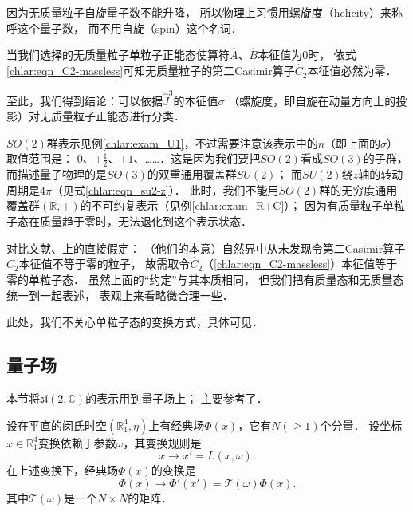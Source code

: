 因为无质量粒子自旋量子数不能升降，
所以物理上习惯用{\heiti 螺旋度}（helicity）来称呼这个量子数，
而不用自旋（spin）这个名词．


当我们选择的无质量粒子单粒子正能态使算符$\hat{A}$、$\hat{B}$本征值为$0$时，
依式\eqref{chlar:eqn_C2-massless}可知无质量粒子的第二Casimir算子$\hat{C}_2$本征值必然为零．



至此，我们得到结论：{\kaishu 可以依据$\hat{J}^3$的本征值$\sigma$
	（螺旋度，即自旋在动量方向上的投影）对无质量粒子正能态进行分类．}

$SO(2)$群表示见例\ref{chlar:exam_U1}，不过需要注意该表示中的$n$（即上面的$\sigma$）取值范围是：
$0$、$\pm\frac{1}{2}$、$\pm 1$、……．这是因为我们要把$SO(2)$看成$SO(3)$的子群，
而描述量子物理的是$SO(3)$的双重通用覆盖群$SU(2)$；
而$SU(2)$绕$z$轴的转动周期是$4\pi$（见式\eqref{chlar:eqn_su2-z}）．
此时，我们不能用$SO(2)$群的无穷度通用覆盖群$(\mathbb{R},+)$的不可约复表示（见例\ref{chlar:exam_R+C}）；
因为有质量粒子单粒子态在质量趋于零时，无法退化到这个表示状态．


对比文献\parencite[p.72]{weinberg_vol1}、\parencite[p.198]{tung-1985}上的直接假定：
（他们的本意）自然界中从未发现令第二Casimir算子$\hat{C}_2$本征值不等于零的粒子，
故需取令$\hat{C}_2$（\eqref{chlar:eqn_C2-massless}）本征值等于零的单粒子态．
虽然上面的“约定”与其本质相同，
但我们\cite{liu_ge-2014}把有质量态和无质量态统一到一起表述，
表观上来看略微合理一些．


此处，我们不关心单粒子态的变换方式，具体可见\parencite[\S 2.5]{weinberg_vol1}．

\subsection{量子场}

本节将$\mathfrak{sl}(2,\mathbb{C})$的表示用到量子场上；
主要参考了\parencite[\S 4.3]{Greiner-FQ-1996}．


设在平直的闵氏时空$(\mathbb{R}^4_1,\eta)$上有经典场$\Phi(x)$，它有$N(\geqslant 1)$个分量．
设坐标$x\in \mathbb{R}^4_1$变换依赖于参数$\omega$，其变换规则是
\begin{equation}
	x\to x'=L(x,\omega).
\end{equation}
在上述变换下，经典场$\Phi(x)$的变换是
\begin{equation}\label{chlar:eqn_cPhi}
	\Phi(x)\to \Phi'(x')= \mathcal{T}(\omega) \Phi(x).
\end{equation}
其中$\mathcal{T}(\omega)$是一个$N\times N$的矩阵．

